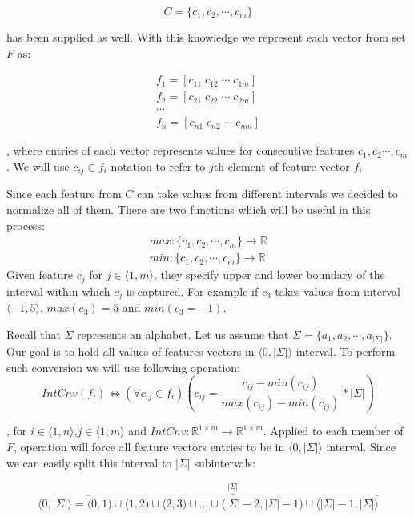 \documentclass{mini}
\begin{document}
\[ C = \{ c_1 , c_2, \cdots , c_m \}\] 

has been supplied as well. With this knowledge we represent each vector from set $F$ as: 

\begin{align*}
f_1 = [ c_{11} \; c_{12} \; \cdots \; c_{1m}] \\
f_2 = [ c_{21} \; c_{22} \; \cdots \; c_{2m}] \\
\cdots \\
f_n = [ c_{n1} \; c_{n2} \; \cdots \; c_{nm}] 
\end{align*}

, where entries of each vector represents values for consecutive features $c_1, c_2 \cdots , c_m$. We will use $c_{ij }\in f_i$ notation to refer to $j$th element of feature vector $f_i$ 

Since each feature from $C$ can take values from different intervals we decided to normalize all of them. There are two functions which will be useful in this process:
\begin{align*}
max : \{c_1, c_2, \cdots, c_m\} \rightarrow \mathbb{R} \\
min : \{c_1, c_2, \cdots, c_m\} \rightarrow \mathbb{R}
\end{align*}
Given feature $c_j$ for $j \in \langle 1, m \rangle$, they specify upper and lower boundary of the interval within which $c_j$ is captured. For example if $c_3$ takes values from interval $\langle -1 , 5 \rangle$, $max(c_3) = 5$ and $min(c_3 = -1)$.

Recall that $\Sigma$ represents an alphabet. Let us assume that $\Sigma = \{a_1 , a_2, \cdots, a_{|\Sigma|}\}$. Our goal is to hold all values of features vectors in $\langle 0 , |\Sigma| \rangle$ interval. To perform such conversion we will use following operation:
\begin{equation}
IntCnv(f_i) \Leftrightarrow (\forall{c_{ij} \in f_i})(c_{ij} =  \frac{c_{ij} - min(c_{ij})}{max(c_{ij}) - min(c_{ij})} * |\Sigma|)
\end{equation}

, for $i \in \langle 1, n \rangle$,$j \in \langle 1, m \rangle$ and $IntCnv : \mathbb{R}^{1 \times m} \rightarrow \mathbb{R}^{1 \times m}$. Applied to each member of $F$, operation will force all feature vectors entries to be in $\langle 0 , |\Sigma| \rangle$ interval. Since we can easily split this interval to $|\Sigma|$ subintervals:

\[
\langle 0 , |\Sigma| \rangle = \overbrace{\langle 0 , 1) \cup \langle 1 , 2 ) \cup \langle 2 , 3 ) \cup \ldots \cup \langle |\Sigma| -2 , |\Sigma| -1 ) \cup \langle |\Sigma| -1, |\Sigma|  \rangle}^{|\Sigma|}
\] 
\end{document}
